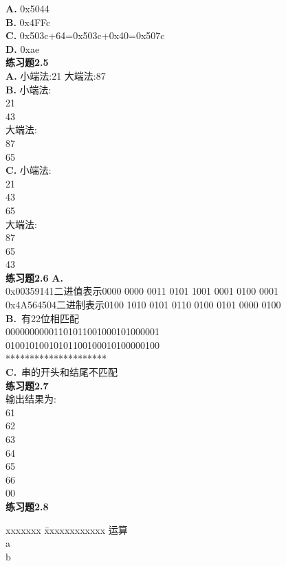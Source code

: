 \documentclass{article}
\begin{document}
\begin{CJK}{UTF8}{uyhei}
\textbf{A.} 0x5044 \\
\textbf{B.} 0x4FFc \\
\textbf{C.} 0x503c+64=0x503c+0x40=0x507c \\
\textbf{D.} 0xae
\ \\[0.5cm]
\textbf{练习题2.5} \\
\textbf{A.}
小端法:21
大端法:87 \\
\textbf{B.}
小端法: \\ 21 \\ 43 \\
大端法: \\ 87 \\ 65 \\
\textbf{C.}
小端法: \\ 21 \\ 43 \\ 65 \\
大端法: \\ 87 \\ 65 \\ 43 \\[0.5cm]
\textbf{练习题2.6}
\textbf{A.} \\ 0x00359141二进值表示0000 0000 0011 0101 1001 0001 0100 0001 \\
0x4A564504二进制表示0100 1010 0101 0110 0100 0101 0000 0100 \\
\textbf{B.}\ 有22位相匹配 \\
00000000001101011001000101000001 \\
\hspace*{1em}01001010010101100100010100000100 \\
\hspace*{5.5em}********************* \\
\textbf{C.}\ 串的开头和结尾不匹配 \\[3ex]
\textbf{练习题2.7} \\
输出结果为: \\
61 \\ 62 \\ 63 \\ 64 \\ 65 \\ 66 \\ 00 \\[3ex]
\textbf{练习题2.8} \\
\begin{tabbing}
	xxxxxxx		\= 	xxxxxxxxxxxx	\kill
	运算		\> 	[01101001]	\\
	a		\>	[01010101]	\\
	b		\>	[01010101]	\\

\end{tabbing}
\end{CJK}
\end{document}
